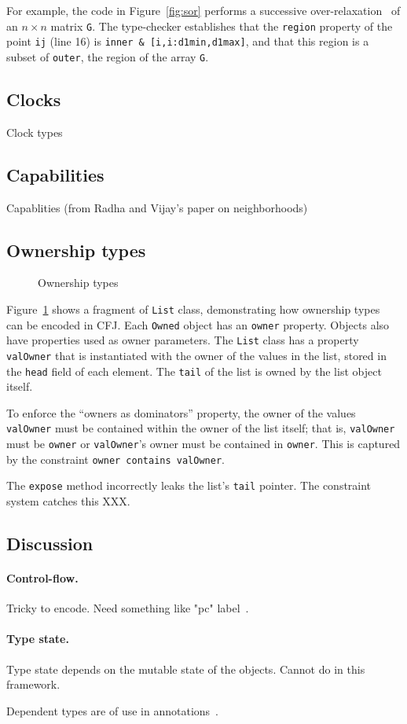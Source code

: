 For example, the code in Figure~\ref{fig:sor} performs a successive
over-relaxation~\cite{sor} of an $n \times n$ matrix {\tt G}.
The type-checker establishes that the {\tt region}
property of the point {\tt ij} (line 16) is
{\tt inner \& [i,i:d1min,d1max]}, and that this
region is a subset of {\tt outer}, the region of the array {\tt G}.

%

\subsection{Clocks}

Clock types

\subsection{Capabilities}

Capablities (from Radha and Vijay's paper on neighborhoods)

\subsection{Ownership types}

\begin{figure}

\caption{Ownership types}
\label{fig:ownership}
\end{figure}

Figure~\ref{fig:ownership} shows
 a fragment of {\tt List} class, 
demonstrating how ownership
types~\cite{ownership-types} can be encoded in CFJ.
Each {\tt Owned} object has an {\tt owner} property.
Objects also have properties used as owner parameters.
The {\tt List} class has a property {\tt valOwner} that is
instantiated with the owner of the values in the list, stored
in the {\tt head} field of each element.
The {\tt tail} of the list is owned by the list object itself.

To enforce the ``owners as dominators'' property, the owner of
the values {\tt valOwner} must be contained within the owner
of the list itself; that is, {\tt valOwner} must be {\tt owner}
or {\tt valOwner}'s owner must be contained in {\tt owner}.
This is captured by the constraint {\tt owner contains valOwner}.

The {\tt expose} method incorrectly leaks the
list's {\tt tail} pointer.
The constraint system catches this XXX.

\subsection{Discussion}

\paragraph{Control-flow.}
Tricky to encode.  Need something like "pc" label~\cite{jif}.

\paragraph{Type state.}
Type state depends on the mutable state of the 
objects.  Cannot do in this framework.

Dependent types are of use in annotations~\cite{ns07-x10anno}.
